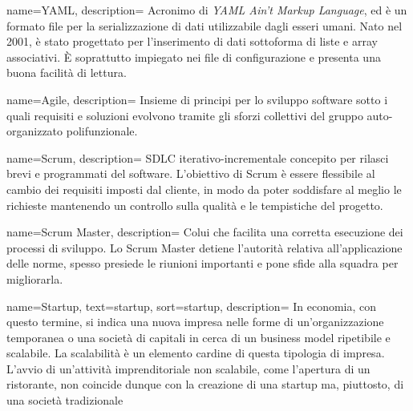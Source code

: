  {
  name=YAML,
  description={
Acronimo di \textit{YAML Ain't Markup Language}, ed è un formato file
per la serializzazione di dati utilizzabile dagli esseri umani. Nato nel 2001,
è stato progettato per l'inserimento di dati sottoforma di liste e array
associativi. È soprattutto impiegato nei file di configurazione e
presenta una buona facilità di lettura.
}
}

 {
  name=Agile,
  description={
Insieme di principi per lo sviluppo software sotto i quali requisiti e
soluzioni evolvono tramite gli sforzi collettivi del gruppo auto-organizzato
polifunzionale.
}
}

 {
  name=Scrum,
  description={
SDLC iterativo-incrementale concepito per rilasci brevi e programmati del
software. L'obiettivo di Scrum è essere flessibile al cambio dei requisiti
imposti dal cliente, in modo da poter soddisfare al meglio le richieste
mantenendo un controllo sulla qualità e le tempistiche del progetto.
}
}

 {
  name=Scrum Master,
  description={
Colui che facilita una corretta esecuzione dei processi di sviluppo. Lo Scrum
Master detiene l'autorità relativa all'applicazione delle norme, spesso
presiede le riunioni importanti e pone sfide alla squadra per migliorarla.
}
}

{
  name=Startup,
  text=startup,
  sort=startup,
  description={
In economia, con questo termine, si indica una nuova impresa
nelle forme di un'organizzazione temporanea o una società di capitali in cerca
di un business model ripetibile e scalabile.
La scalabilità è un elemento cardine di questa tipologia di impresa. L'avvio di
un'attività imprenditoriale non scalabile, come l'apertura di un ristorante,
non coincide dunque con la creazione di una startup ma, piuttosto, di una
società tradizionale
}
}



